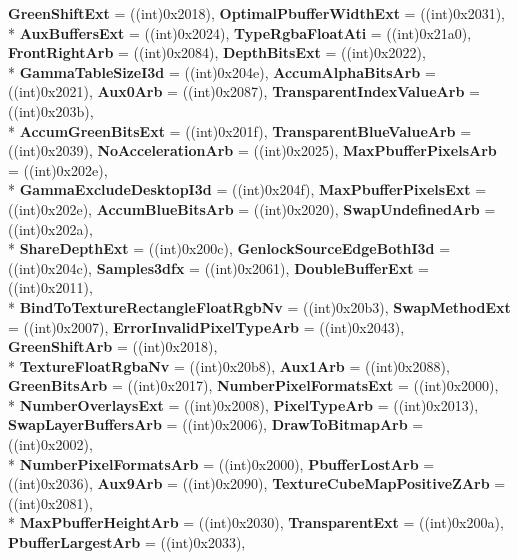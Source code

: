\begin{DoxyCompactItemize}
{\bfseries Green\-Shift\-Ext} = ((int)0x2018), 
{\bfseries Optimal\-Pbuffer\-Width\-Ext} = ((int)0x2031), 
\\*
{\bfseries Aux\-Buffers\-Ext} = ((int)0x2024), 
{\bfseries Type\-Rgba\-Float\-Ati} = ((int)0x21a0), 
{\bfseries Front\-Right\-Arb} = ((int)0x2084), 
{\bfseries Depth\-Bits\-Ext} = ((int)0x2022), 
\\*
{\bfseries Gamma\-Table\-Size\-I3d} = ((int)0x204e), 
{\bfseries Accum\-Alpha\-Bits\-Arb} = ((int)0x2021), 
{\bfseries Aux0\-Arb} = ((int)0x2087), 
{\bfseries Transparent\-Index\-Value\-Arb} = ((int)0x203b), 
\\*
{\bfseries Accum\-Green\-Bits\-Ext} = ((int)0x201f), 
{\bfseries Transparent\-Blue\-Value\-Arb} = ((int)0x2039), 
{\bfseries No\-Acceleration\-Arb} = ((int)0x2025), 
{\bfseries Max\-Pbuffer\-Pixels\-Arb} = ((int)0x202e), 
\\*
{\bfseries Gamma\-Exclude\-Desktop\-I3d} = ((int)0x204f), 
{\bfseries Max\-Pbuffer\-Pixels\-Ext} = ((int)0x202e), 
{\bfseries Accum\-Blue\-Bits\-Arb} = ((int)0x2020), 
{\bfseries Swap\-Undefined\-Arb} = ((int)0x202a), 
\\*
{\bfseries Share\-Depth\-Ext} = ((int)0x200c), 
{\bfseries Genlock\-Source\-Edge\-Both\-I3d} = ((int)0x204c), 
{\bfseries Samples3dfx} = ((int)0x2061), 
{\bfseries Double\-Buffer\-Ext} = ((int)0x2011), 
\\*
{\bfseries Bind\-To\-Texture\-Rectangle\-Float\-Rgb\-Nv} = ((int)0x20b3), 
{\bfseries Swap\-Method\-Ext} = ((int)0x2007), 
{\bfseries Error\-Invalid\-Pixel\-Type\-Arb} = ((int)0x2043), 
{\bfseries Green\-Shift\-Arb} = ((int)0x2018), 
\\*
{\bfseries Texture\-Float\-Rgba\-Nv} = ((int)0x20b8), 
{\bfseries Aux1\-Arb} = ((int)0x2088), 
{\bfseries Green\-Bits\-Arb} = ((int)0x2017), 
{\bfseries Number\-Pixel\-Formats\-Ext} = ((int)0x2000), 
\\*
{\bfseries Number\-Overlays\-Ext} = ((int)0x2008), 
{\bfseries Pixel\-Type\-Arb} = ((int)0x2013), 
{\bfseries Swap\-Layer\-Buffers\-Arb} = ((int)0x2006), 
{\bfseries Draw\-To\-Bitmap\-Arb} = ((int)0x2002), 
\\*
{\bfseries Number\-Pixel\-Formats\-Arb} = ((int)0x2000), 
{\bfseries Pbuffer\-Lost\-Arb} = ((int)0x2036), 
{\bfseries Aux9\-Arb} = ((int)0x2090), 
{\bfseries Texture\-Cube\-Map\-Positive\-Z\-Arb} = ((int)0x2081), 
\\*
{\bfseries Max\-Pbuffer\-Height\-Arb} = ((int)0x2030), 
{\bfseries Transparent\-Ext} = ((int)0x200a), 
{\bfseries Pbuffer\-Largest\-Arb} = ((int)0x2033), 

\end{DoxyCompactItemize}

